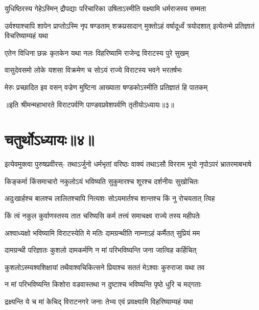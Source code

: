 \twolineshloka
{युधिष्ठिरस्य गेहेऽस्मिन् द्रौपद्याः परिचारिका}
{उषिताऽस्मीति वक्ष्यामि धर्मराजस्य सम्मता}


\threelineshloka
{उर्वश्याश्चापि शापेन प्राप्तोऽस्मि नृप षण्डताम्}
{शक्रप्रसादान् मुक्तोऽहं वर्षादूर्ध्वं त्रयोदशात्}
{इत्येतन्मे प्रतिज्ञातं विचरिष्याम्यहं यथा}


\twolineshloka
{एतेन विधिना छन्नः कृतकेन यथा नलः}
{विहरिष्यामि राजेन्द्र विराटस्य पुरे सुखम्}




\twolineshloka
{वासुदेवसमो लोके यशसा विक्रमेण च}
{सोऽयं राज्ये विराटस्य भवने भरतर्षभः}


\twolineshloka
{मेरुः प्रच्छादित इव वसन् वज्रेण मुष्टिना}
{आख्याता षण्डकोऽस्मीति प्रतिज्ञातं हि पातकम्}

॥इति श्रीमन्महाभारते विराटपर्वणि पाण्डवप्रवेशपर्वणि तृतीयोऽध्यायः॥३॥

\chapter{चतुर्थोऽध्यायः॥४॥}

\fourlineindentedshloka
{इत्येवमुक्त्वा पुरुषप्रवीरस्-}
{तथाऽर्जुनो धर्मभृतां वरिष्ठः}
{वाक्यं तथाऽसौ विरराम भूयो}
{नृपोऽपरं भ्रातरमाबभाषे}


\twolineshloka
{किङ्कर्मा किंसमाचारो नकुलोऽयं भविष्यति}
{सुकुमारश्च शूरश्च दर्शनीयः सुखोचितः}


\twolineshloka
{अदुःखार्हश्च बालश्च लालितश्चापि नित्यशः}
{सोऽयमार्तश्च शान्तश्च किं नु रोचयतात् त्विह}


\twolineshloka
{किं त्वं नकुल कुर्वाणस्तस्य तात चरिष्यसि}
{कर्म तत्त्वं समाचक्ष्व राज्ये तस्य महीपतेः}




\twolineshloka
{अश्वाध्यक्षो भविष्यामि विराटस्येति मे मतिः}
{दामग्रन्थीति नाम्नाऽहं कर्मैतत् सुप्रियं मम}


\twolineshloka
{दामग्रन्थी परिज्ञातः कुशलो दामकर्मणि}
{न मां परिभविष्यन्ति जना जात्विह कर्हिचित्}


\twolineshloka
{कुशलोऽस्म्यश्वशिक्षायां तथैवाश्वचिकित्सने}
{प्रियाश्च सततं मेऽश्वाः कुरुराजा यथा तव}


\twolineshloka
{न मां परिभविष्यन्ति किशोरा वडवास्तथा}
{न दुष्टाश्च भविष्यन्ति पृष्ठे धुरि च मद्गताः}


\twolineshloka
{द्रक्ष्यन्ति ये च मां केचिद् विराटनगरे जनाः}
{तेभ्य एवं प्रवक्ष्यामि विहरिष्याम्यहं यथा}



